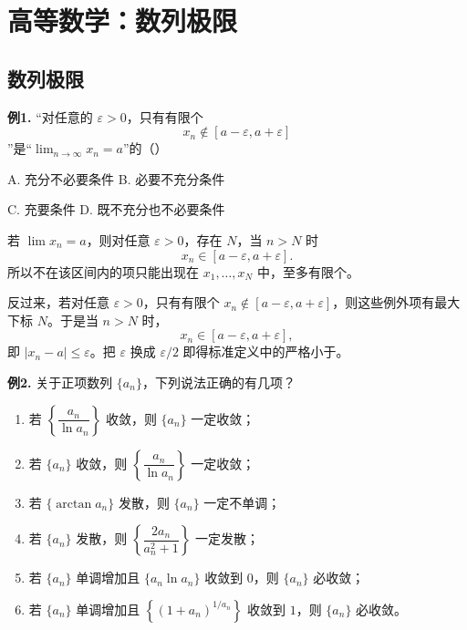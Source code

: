 \chapter{高等数学：数列极限}

\section{数列极限}

\begin{problemblock}
\textbf{例1.} “对任意的 \(\varepsilon>0\)，只有有限个
\[
x_n\notin[a-\varepsilon,a+\varepsilon]
\]
”是“\(\displaystyle\lim_{n\to\infty}x_n=a\)”的（\quad）

A. 充分不必要条件 \qquad B. 必要不充分条件

C. 充要条件 \qquad D. 既不充分也不必要条件
\end{problemblock}

\begin{solutionblock}

若 \(\lim x_n=a\)，则对任意 \(\varepsilon>0\)，存在 \(N\)，当 \(n>N\) 时
\[
x_n\in[a-\varepsilon,a+\varepsilon].
\]
所以不在该区间内的项只能出现在 \(x_1,\dots,x_N\) 中，至多有限个。

反过来，若对任意 \(\varepsilon>0\)，只有有限个 \(x_n\notin[a-\varepsilon,a+\varepsilon]\)，则这些例外项有最大下标 \(N\)。于是当 \(n>N\) 时，
\[
x_n\in[a-\varepsilon,a+\varepsilon],
\]
即 \(|x_n-a|\le\varepsilon\)。把 \(\varepsilon\) 换成 \(\varepsilon/2\) 即得标准定义中的严格小于。

\end{solutionblock}

\begin{problemblock}
\textbf{例2.} 关于正项数列 \(\{a_n\}\)，下列说法正确的有几项？
\begin{enumerate}[label=\arabic*., leftmargin=2.2em]
\item 若 \(\left\{\dfrac{a_n}{\ln a_n}\right\}\) 收敛，则 \(\{a_n\}\) 一定收敛；
\item 若 \(\{a_n\}\) 收敛，则 \(\left\{\dfrac{a_n}{\ln a_n}\right\}\) 一定收敛；
\item 若 \(\{\arctan a_n\}\) 发散，则 \(\{a_n\}\) 一定不单调；
\item 若 \(\{a_n\}\) 发散，则 \(\left\{\dfrac{2a_n}{a_n^2+1}\right\}\) 一定发散；
\item 若 \(\{a_n\}\) 单调增加且 \(\{a_n\ln a_n\}\) 收敛到 \(0\)，则 \(\{a_n\}\) 必收敛；
\item 若 \(\{a_n\}\) 单调增加且 \(\left\{(1+a_n)^{1/a_n}\right\}\) 收敛到 \(1\)，则 \(\{a_n\}\) 必收敛。
\end{enumerate}
\end{problemblock}

